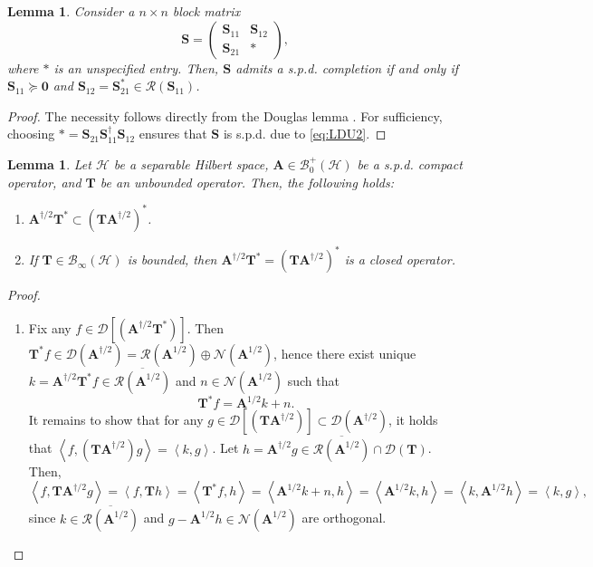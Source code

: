 \documentclass[noinfoline]{imsart}\setcounter{tocdepth}{2}
\newcommand{\m}[1]{\mathbf{#1}} %
\renewcommand{\c}[1]{\mathcal{#1}} %
\newcommand{\innpr}[2]{{\left\langle {#1},{#2}\right\rangle}} %
\theoremstyle{plain}
\newtheorem{lemma}[theorem]{Lemma}
\begin{document}
\begin{appendix}
\begin{lemma}\label{lem:spd:complete}
Consider a $n \times n$ block matrix
\begin{equation*}
    \m{S} = \begin{pmatrix}
    \m{S}_{11} & \m{S}_{12} \\
    \m{S}_{21} & \ast
    \end{pmatrix},
\end{equation*}
where $\ast$ is an unspecified entry. Then, $\m{S}$ admits a s.p.d. completion if and only if $\m{S}_{11} \succeq \m{0}$ and $\m{S}_{12} = \m{S}_{21}^{*} \in \c{R}(\m{S}_{11})$. 
\end{lemma}
\begin{proof}
The necessity follows directly from the Douglas lemma \cite{douglas1966majorization}. For sufficiency, choosing $\ast = \m{S}_{21} \m{S}_{11}^{\dagger} \m{S}_{12}$ ensures that $\m{S}$ is s.p.d. due to \eqref{eq:LDU2}.
\end{proof}

\begin{lemma}\label{lem:closable:half}
Let $\c{H}$ be a separable Hilbert space, $\m{A} \in \c{B}_{0}^{+}(\c{H})$ be a s.p.d. compact operator, and $\m{T}$ be an unbounded operator. Then, the following holds:
\begin{enumerate}
\item $\m{A}^{\dagger/2} \m{T}^{*} \subset (\m{T} \m{A}^{\dagger/2})^{*}$.
\item If $\m{T} \in \c{B}_{\infty}(\c{H})$ is bounded, then $\m{A}^{\dagger/2} \m{T}^{*} = (\m{T} \m{A}^{\dagger/2})^{*}$ is a closed operator.
\end{enumerate}
\end{lemma}
\begin{proof}
\begin{enumerate}[leftmargin=*]
\item Fix any $f \in \c{D}[(\m{A}^{\dagger/2} \m{T}^{*})]$. Then $\m{T}^{*} f \in \c{D}(\m{A}^{\dagger/2}) = \c{R}(\m{A}^{1/2}) \oplus \c{N}(\m{A}^{1/2})$, hence there exist unique $k = \m{A}^{\dagger/2} \m{T}^{*} f \in \overline{\c{R}(\m{A}^{1/2})}$ and $n \in \c{N}(\m{A}^{1/2})$ such that 
\begin{equation*}
    \m{T}^{*} f = \m{A}^{1/2} k + n.
\end{equation*}
It remains to show that for any $g \in \c{D}[(\m{T} \m{A}^{\dagger/2})] \subset \c{D}(\m{A}^{\dagger/2})$, it holds that $\innpr{f}{(\m{T} \m{A}^{\dagger/2}) g} = \innpr{k}{g}$.
Let $h = \m{A}^{\dagger/2} g \in \overline{\c{R}(\m{A}^{1/2})} \cap \c{D}(\m{T})$. Then,
\begin{equation*}
    \innpr{f}{\m{T} \m{A}^{\dagger/2} g} = \innpr{f}{\m{T} h} = \innpr{\m{T}^{*} f}{h} = \innpr{\m{A}^{1/2} k + n}{h} = \innpr{\m{A}^{1/2} k}{h} = \innpr{k}{\m{A}^{1/2} h} = \innpr{k}{g},
\end{equation*}
since $k \in \overline{\c{R}(\m{A}^{1/2})}$ and $g - \m{A}^{1/2} h \in \c{N}(\m{A}^{1/2})$ are orthogonal.


\end{enumerate}
\end{proof}
\end{appendix}
\end{document}
